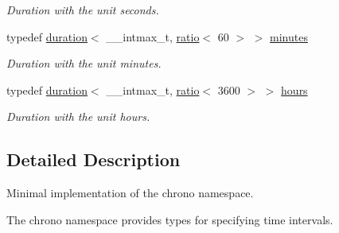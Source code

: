 \begin{DoxyCompactItemize}
\begin{DoxyCompactList}\small\item\em Duration with the unit seconds. \end{DoxyCompactList}\item 
typedef \hyperlink{classtthread_1_1chrono_1_1duration}{duration}$<$ \+\_\+\+\_\+intmax\+\_\+t, \hyperlink{classtthread_1_1ratio}{ratio}$<$ 60 $>$ $>$ \hyperlink{namespacetthread_1_1chrono_a03115955459a9038f7a4ad79b45429a2}{minutes}\hypertarget{namespacetthread_1_1chrono_a03115955459a9038f7a4ad79b45429a2}{}\label{namespacetthread_1_1chrono_a03115955459a9038f7a4ad79b45429a2}

\begin{DoxyCompactList}\small\item\em Duration with the unit minutes. \end{DoxyCompactList}\item 
typedef \hyperlink{classtthread_1_1chrono_1_1duration}{duration}$<$ \+\_\+\+\_\+intmax\+\_\+t, \hyperlink{classtthread_1_1ratio}{ratio}$<$ 3600 $>$ $>$ \hyperlink{namespacetthread_1_1chrono_ad78569d569e30cdb836a6e06d01e51a7}{hours}\hypertarget{namespacetthread_1_1chrono_ad78569d569e30cdb836a6e06d01e51a7}{}\label{namespacetthread_1_1chrono_ad78569d569e30cdb836a6e06d01e51a7}

\begin{DoxyCompactList}\small\item\em Duration with the unit hours. \end{DoxyCompactList}\end{DoxyCompactItemize}


\subsection{Detailed Description}
Minimal implementation of the {\ttfamily chrono} namespace. 

The {\ttfamily chrono} namespace provides types for specifying time intervals. 